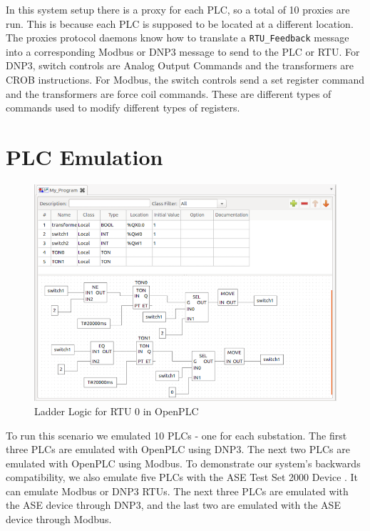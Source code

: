 \documentclass[oneside,11pt,a4paper,oldfontcommands]{book}
\def\code#1{\texttt{#1}}
\begin{document}
\indent \indent
In this system setup there is a proxy for each PLC, so a total of 10 proxies are run.
This is because each PLC is supposed to be located at a different location. \\

\indent
The proxies protocol daemons know how to translate a \code{RTU\_Feedback} message
into a corresponding Modbus or DNP3 message to send to the PLC or RTU. For DNP3,
switch controls are Analog Output Commands and the transformers are CROB 
instructions. For Modbus, the switch controls send a set register command and
the transformers are force coil commands. These are different types of commands
used to modify different types of  registers.

\section{PLC Emulation}

\begin{figure}[ht]
  \begin{center}
  \includegraphics{open_plc}
  \caption{Ladder Logic for RTU 0 in OpenPLC}
  \label{fig:6}
  \end{center}
\end{figure}

\indent \indent
To run this scenario we emulated 10 PLCs - one for each substation. The first
three PLCs are emulated with OpenPLC using DNP3. The next two PLCs are emulated with
OpenPLC using Modbus. To demonstrate our system's backwards compatibility, we also emulate
five PLCs with the ASE Test Set 2000 Device \cite{ASE}. It can emulate
Modbus or DNP3 RTUs. The next three
PLCs are emulated with the ASE device through DNP3, and the last two are emulated
with the ASE device through Modbus. \\
\end{document}
